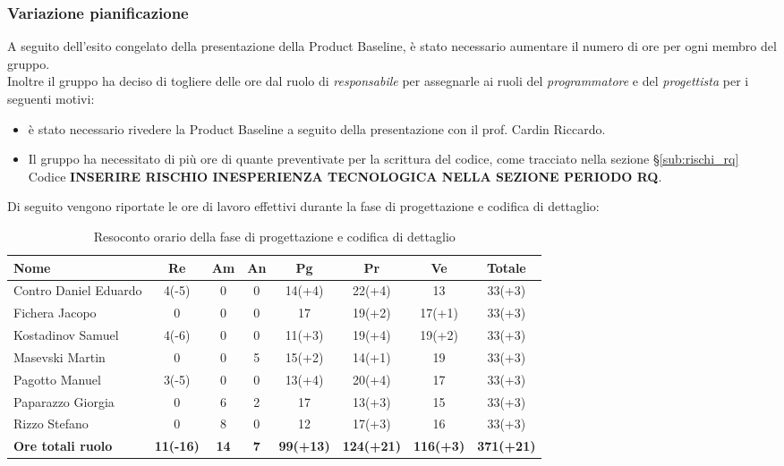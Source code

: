 \documentclass[../piano_di_progetto.tex]{subfiles}
\begin{document}
\subsubsection{Variazione pianificazione}
A seguito dell'esito congelato della presentazione della Product Baseline, è stato necessario aumentare il numero di ore per ogni membro del gruppo.\\
Inoltre il gruppo ha deciso di togliere delle ore dal ruolo di \emph{responsabile} per assegnarle ai ruoli del \emph{programmatore} e del \emph{progettista} per i seguenti motivi:
\begin{itemize}
	\item è stato necessario rivedere la Product Baseline a seguito della presentazione con il prof. Cardin Riccardo.
	\item Il gruppo ha necessitato di più ore di quante preventivate per la scrittura del codice, come tracciato nella sezione \S\ref{sub:rischi_rq} Codice \textbf{INSERIRE RISCHIO INESPERIENZA TECNOLOGICA NELLA SEZIONE PERIODO RQ}. %
\end{itemize}

\noindent Di seguito vengono riportate le ore di lavoro effettivi durante la fase di progettazione e codifica di dettaglio: \\
\begin{table}[!ht]
	\centering
	\begin{tabular}{|l|c|c|c|c|c|c|c|}
	\hline
	\rowcolor{lightgray}
	\textbf{Nome} & \textbf{Re} & \textbf{Am} & \textbf{An} & \textbf{Pg}  & \textbf{Pr}   & \textbf{Ve} & \textbf{Totale}\\
	\hline
	Contro Daniel Eduardo & 4(-5) & 0 & 0 & 14(+4) & 22(+4) & 13 & 33(+3) \\
	Fichera Jacopo & 0 & 0 & 0 & 17 & 19(+2) & 17(+1) & 33(+3) \\
	Kostadinov Samuel & 4(-6) & 0 & 0 & 11(+3) & 19(+4) & 19(+2) & 33(+3) \\			
	Masevski Martin & 0 & 0 & 5 & 15(+2) & 14(+1) & 19 & 33(+3) \\
	Pagotto Manuel & 3(-5) & 0 & 0 & 13(+4) & 20(+4) & 17 & 33(+3) \\			
	Paparazzo Giorgia & 0 & 6 & 2 & 17 & 13(+3) & 15 & 33(+3) \\
	Rizzo Stefano & 0 & 8 & 0 & 12 & 17(+3) & 16 & 33(+3) \\
	\hline
	\textbf{Ore totali ruolo} & \textbf{11(-16)} & \textbf{14} & \textbf{7} & \textbf{99(+13)} & \textbf{124(+21)} & \textbf{116(+3)} & \textbf{371(+21)} \\
	\hline
	\end{tabular}
	\caption{Resoconto orario della fase di progettazione e codifica di dettaglio}
\end{table}
\end{document}
